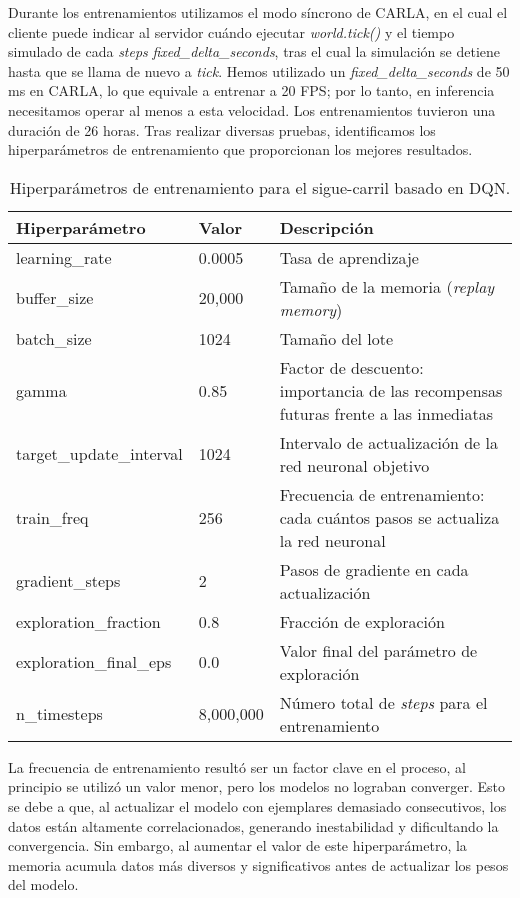 Durante los entrenamientos utilizamos el modo síncrono de CARLA, en el cual el cliente puede indicar al servidor cuándo ejecutar \textit{world.tick()} y el tiempo simulado de cada \textit{steps} \textit{fixed\_delta\_seconds}, tras el cual la simulación se detiene hasta que se llama de nuevo a \textit{tick}. Hemos utilizado un \textit{fixed\_delta\_seconds} de 50 ms en CARLA, lo que equivale a entrenar a 20 \ac{FPS}; por lo tanto, en inferencia necesitamos operar al menos a esta velocidad. Los entrenamientos tuvieron una duración de 26 horas. Tras realizar diversas pruebas, identificamos los hiperparámetros de entrenamiento que proporcionan los mejores resultados.
\begin{table}[ht]
\centering
\renewcommand{\arraystretch}{1.2} %
\begin{tabular}{|l|l|p{9cm}|} %
\hline
\textbf{Hiperparámetro} & \textbf{Valor} & \textbf{Descripción} \\ \hline
learning\_rate & 0.0005 & Tasa de aprendizaje \\ \hline
buffer\_size & 20,000 & Tamaño de la memoria (\textit{replay memory}) \\ \hline
batch\_size & 1024 & Tamaño del lote \\ \hline
gamma & 0.85 & Factor de descuento: importancia de las recompensas futuras frente a las inmediatas \\ \hline
target\_update\_interval & 1024 & Intervalo de actualización de la red neuronal objetivo \\ \hline
train\_freq & 256 & Frecuencia de entrenamiento: cada cuántos pasos se actualiza la red neuronal \\ \hline
gradient\_steps & 2 & Pasos de gradiente en cada actualización \\ \hline
exploration\_fraction & 0.8 & Fracción de exploración \\ \hline
exploration\_final\_eps & 0.0 & Valor final del parámetro de exploración \\ \hline
n\_timesteps & 8,000,000 & Número total de \textit{steps} para el entrenamiento \\ \hline
\end{tabular}
\caption{Hiperparámetros de entrenamiento para el sigue-carril basado en \ac{DQN}.}
\label{tab:hiperparametros}
\end{table}

La frecuencia de entrenamiento resultó ser un factor clave en el proceso, al principio se utilizó un valor menor, pero los modelos no lograban converger. Esto se debe a que, al actualizar el modelo con ejemplares demasiado consecutivos, los datos están altamente correlacionados, generando inestabilidad y dificultando la convergencia. Sin embargo, al aumentar el valor de este hiperparámetro, la memoria acumula datos más diversos y significativos antes de actualizar los pesos del modelo.

